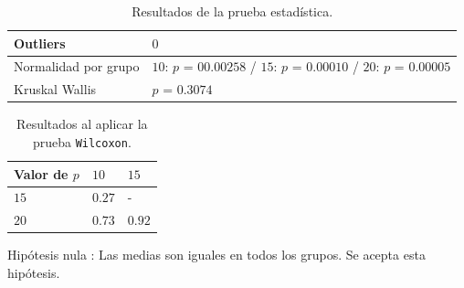 \documentclass{article}
\begin{document}
\begin{table}[h!]
\centering
\caption{Resultados de la prueba estadística.}
\smallskip

\begin{tabular}{ |p{4cm}|p{8cm}|}
 \hline
 Outliers & $0$ \\
 \hline
 Normalidad por grupo & $10$: $p$ = $00.00258$ / $15$: $p$ = $0.00010$ / $20$: $p$ = $0.00005$ \\
 \hline
 Kruskal Wallis & $p$ = $0.3074$ \\
 \hline
\end{tabular}
\label{Cuadro15}
\end{table}

\begin{table}[h!]
\centering
\caption{Resultados al aplicar la prueba \texttt{Wilcoxon}.}
\smallskip

\begin{tabular}{|p{1.7cm}|p{1.7cm}|p{1.7cm}|}
 \hline
Valor de $p$ & $10$ & $15$ \\
 \hline
 $15$ & $0.27$ & -   \\
 \hline
 $20$ & $0.73$ & $0.92$  \\
 \hline
\end{tabular}
\label{Cuadro16}
\end{table}

Hipótesis nula : Las medias son iguales en todos los grupos. Se acepta esta hipótesis.
\end{document}
